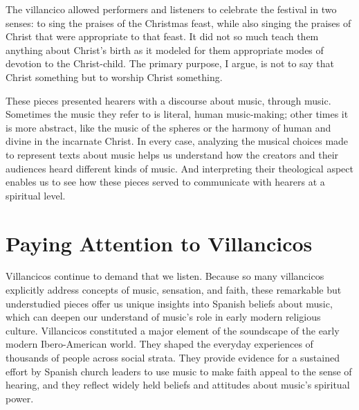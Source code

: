 The villancico allowed performers and listeners to celebrate the festival in two
senses: to sing the praises of the Christmas feast, while also singing the
praises of Christ that were appropriate to that feast. 
It did not so much teach them anything about Christ's birth as it modeled for
them appropriate modes of devotion to the Christ-child.
The primary purpose, I argue, is not to say that Christ  something but
to worship Christ  something.


These pieces presented hearers with a discourse about music, through music.
Sometimes the music they refer to is literal, human music-making; other times
it is more abstract, like the music of the spheres or the harmony of human and
divine in the incarnate Christ.
In every case, analyzing the musical choices made to represent texts about
music helps us understand how the creators and their audiences heard different
kinds of music.
And interpreting their theological aspect enables us to see how these pieces
served to communicate with hearers at a spiritual level.

\section{Paying Attention to Villancicos}

Villancicos continue to demand that we listen. 
Because so many villancicos explicitly address concepts of music, sensation,
and faith, these remarkable but understudied pieces offer us unique insights
into Spanish beliefs about music, which can deepen our understand of music's
role in early modern religious culture.
Villancicos constituted a major element of the soundscape of the
early modern Ibero-American world.
They shaped the everyday experiences of thousands of people across social
strata.
They provide evidence for a sustained effort by Spanish church leaders to use
music to make faith appeal to the sense of hearing, and they reflect widely
held beliefs and attitudes about music's spiritual power.

